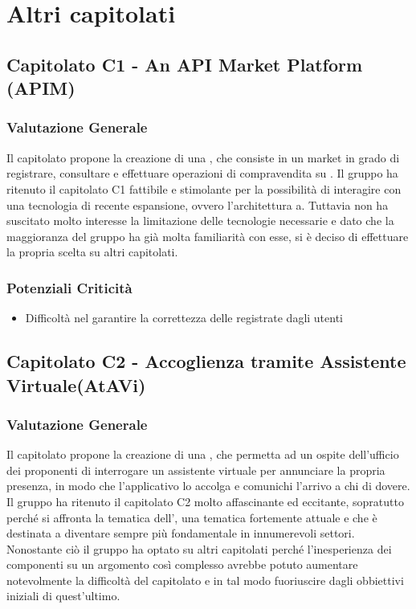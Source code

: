 \section{Altri capitolati}
  \subsection{Capitolato C1 - An API Market Platform (APIM)}
    \subsubsection{Valutazione Generale}
    Il capitolato propone la creazione di una , che consiste in un  market in grado di registrare, consultare e effettuare operazioni di compravendita su .
    Il gruppo ha ritenuto il capitolato C1 fattibile e stimolante per la possibilità di interagire con una tecnologia di recente espansione, ovvero l'architettura a. Tuttavia non ha suscitato molto interesse la limitazione delle tecnologie necessarie e dato che la maggioranza del gruppo ha già molta familiarità con esse, si è deciso di effettuare la propria scelta su altri capitolati.
    \subsubsection{Potenziali Criticità}
     \begin{itemize}
      \item Difficoltà nel garantire la correttezza delle  registrate dagli utenti
     \end{itemize}
  \subsection{Capitolato C2 - Accoglienza tramite Assistente Virtuale(AtAVi)}
    \subsubsection{Valutazione Generale}
    Il capitolato propone la creazione di una , che permetta ad un ospite dell'ufficio dei proponenti di interrogare un assistente virtuale per annunciare la propria presenza, in modo che l'applicativo lo accolga e comunichi l'arrivo a chi di dovere.
    Il gruppo ha ritenuto il capitolato C2 molto affascinante ed eccitante, sopratutto perché si affronta la tematica dell', una tematica fortemente attuale e che è destinata a diventare sempre più fondamentale in innumerevoli settori. Nonostante ciò il gruppo ha optato su altri capitolati perché l'inesperienza dei componenti su un argomento così complesso avrebbe potuto aumentare notevolmente la difficoltà del capitolato e in tal modo fuoriuscire dagli obbiettivi iniziali di quest'ultimo.
